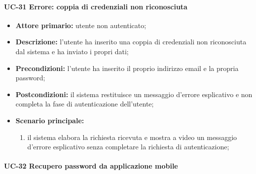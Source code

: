 \paragraph{UC-31 Errore: coppia di credenziali non riconosciuta}

	\begin{itemize}
		\item \textbf{Attore primario:} utente non autenticato;

		\item \textbf{Descrizione:} l'utente ha inserito una coppia di credenziali non riconosciuta dal sistema e ha inviato i propri dati;

		\item \textbf{Precondizioni:} l'utente ha inserito il proprio indirizzo email e la propria password;

		\item \textbf{Postcondizioni:} il sistema restituisce un messaggio d'errore esplicativo e non completa la fase di autenticazione dell'utente;

		\item \textbf{Scenario principale:}
	  		\begin{enumerate}
		  		\item il sistema elabora la richiesta ricevuta e mostra a video un messaggio d'errore esplicativo senza completare la richiesta di autenticazione; 
	  		\end{enumerate}
	\end{itemize}

\paragraph{UC-32 Recupero password da applicazione mobile}

